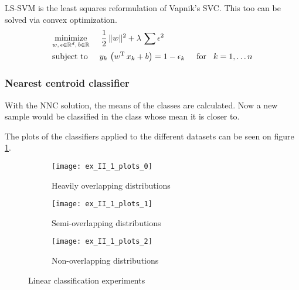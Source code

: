 LS-SVM is the least squares reformulation of Vapnik's SVC.
This too can be solved via convex optimization.
\begin{equation}
\begin{split}
	&\underset{w,\,\epsilon\in\mathbb{R}^d,\,b\in\mathbb{R}}{\operatorname{minimize}}\hspace{5mm}
		\frac{1}{2}\,\lVert w\rVert^2 + \lambda\,\sum\epsilon^2\\
	&\text{subject to}\hspace{5mm}
		y_k\,\left(w\textsuperscript{T}\,x_k + b\right) = 1-\epsilon_k\hspace{5mm}\text{for}\hspace{3mm} k=1,\dots n
\end{split}
\end{equation}

\subsubsection*{Nearest centroid classifier}

With the NNC solution, the means of the classes are calculated.
Now a new sample would be classified in the class whose mean
it is closer to.

The plots of the classifiers applied to the different datasets
can be seen on figure \ref{fig:linear-classification}.

\begin{figure}[H]
	\centering
	\begin{subfigure}{\textwidth}
		\centering
		\texttt{[image: ex\_II\_1\_plots\_0]}
		\caption{Heavily overlapping distributions}
	\end{subfigure}
	\begin{subfigure}{\textwidth}
		\centering
		\texttt{[image: ex\_II\_1\_plots\_1]}
		\caption{Semi-overlapping distributions}
	\end{subfigure}
	\begin{subfigure}{\textwidth}
		\centering
		\texttt{[image: ex\_II\_1\_plots\_2]}
		\caption{Non-overlapping distributions}
	\end{subfigure}
	\caption{Linear classification experiments}
	\label{fig:linear-classification}
\end{figure}

